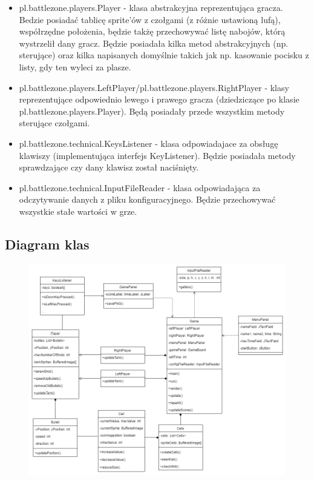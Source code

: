 \documentclass{article}
\begin{document}
\begin{itemize}
\item pl.battlezone.players.Player - klasa abstrakcyjna reprezentująca gracza. Bedzie posiadać tablicę sprite'ów z czołgami (z różnie ustawioną lufą), współrzędne położenia, będzie takżę przechowywać listę nabojów, którą wystrzelił dany gracz. Będzie posiadała kilka metod abstrakcyjnych (np. sterujące) oraz kilka napisanych domyślnie takich jak np. kasowanie pocisku z listy, gdy ten wyleci za plasze.

\item pl.battlezone.players.LeftPlayer/pl.battlezone.players.RightPlayer - klasy reprezentujące odpowiednio lewego i prawego gracza (dziedziczące po klasie pl.battlezone.players.Player). Będą posiadały przede wszystkim metody sterujące czołgami.

\item pl.battlezone.technical.KeysListener - klasa odpowiadajace za obsługę klawiszy (implementująca interfejs KeyListener). Będzie posiadała metody sprawdzające czy dany klawisz został naciśnięty.

\item pl.battlezone.technical.InputFileReader - klasa odpowiadająca za odczytywanie danych z pliku konfiguracyjnego. Będzie przechowywać wszystkie stałe wartości w grze.

\end{itemize}
\subsection{Diagram klas}
\begin{figure} [hbt!]
    \centering
    \includegraphics[width=13cm]{DiagramKlas.png}
\end{figure}
\end{document}
